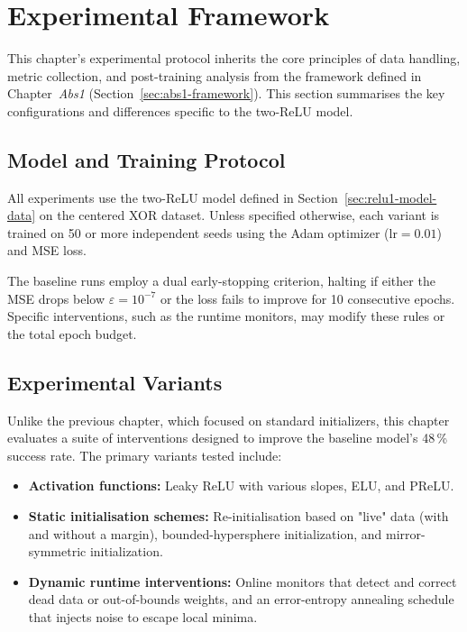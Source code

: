 \section{Experimental Framework}
\label{sec:relu1-framework}

This chapter's experimental protocol inherits the core principles of data handling, metric collection, and post-training analysis from the framework defined in Chapter~\textit{Abs1} (Section~\ref{sec:abs1-framework}). This section summarises the key configurations and differences specific to the two-ReLU model.

\subsection*{Model and Training Protocol}
All experiments use the two-ReLU model defined in Section~\ref{sec:relu1-model-data} on the centered XOR dataset. Unless specified otherwise, each variant is trained on 50 or more independent seeds using the Adam optimizer ($\text{lr}=0.01$) and MSE loss.

The baseline runs employ a dual early-stopping criterion, halting if either the MSE drops below \(\varepsilon=10^{-7}\) or the loss fails to improve for 10 consecutive epochs. Specific interventions, such as the runtime monitors, may modify these rules or the total epoch budget.

\subsection*{Experimental Variants}
Unlike the previous chapter, which focused on standard initializers, this chapter evaluates a suite of interventions designed to improve the baseline model's 48\,\% success rate. The primary variants tested include:
\begin{itemize}
    \item \textbf{Activation functions:} Leaky ReLU with various slopes, ELU, and PReLU.
    \item \textbf{Static initialisation schemes:} Re-initialisation based on "live" data (with and without a margin), bounded-hypersphere initialization, and mirror-symmetric initialization.
    \item \textbf{Dynamic runtime interventions:} Online monitors that detect and correct dead data or out-of-bounds weights, and an error-entropy annealing schedule that injects noise to escape local minima.
\end{itemize}

